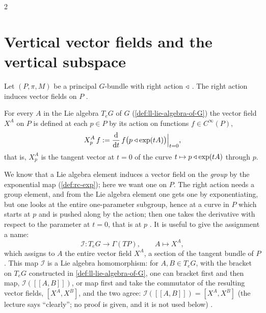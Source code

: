 \begin{paracol}{2}
\section{Vertical vector fields and the vertical subspace}\label{sec:cn-vertical}

Let $(P,\pi,M)$ be a principal $G$-bundle with right action $\mathbin{\triangleleft}$ . The right action induces vector fields on $P$ .
\begin{definition}\label{def:cn-XA}
For every $A$ in the Lie algebra $T_eG$ of $G$ (\cref{def:ll-lie-algebra-of-G}) the vector field $X^A$ on $P$ is defined at each $p\in P$ by its action on functions $f\in C^\infty(P)$,
\[
  X^A_p\,f:=\frac{\mathrm d}{\mathrm dt}\,f\bigl(p\mathbin{\triangleleft}\exp(tA)\bigr)\Big|_{t=0},
\]
that is, $X^A_p$ is the tangent vector at $t=0$ of the curve $t\mapsto p\mathbin{\triangleleft}\exp(tA)$ through $p$.     
\end{definition}
We know that a Lie algebra element induces a vector field on the \emph{group} by the exponential map (\cref{def:rc-exp}); here we want one on $P$. The right action needs a group element, and from the Lie algebra element one gets one by exponentiating, but one looks at the entire one-parameter subgroup, hence at a curve in $P$ which starts at $p$ and is pushed along by the action; then one takes the derivative with respect to the parameter at $t=0$, that is at $p$   . It is useful to give the assignment a name:
\[
  \mathcal I\colon T_eG\to\Gamma(TP),\qquad A\longmapsto X^A ,
\]
which assigns to $A$ the entire vector field $X^A$, a section of the tangent bundle of $P$  . This map $\mathcal I$ is a Lie algebra homomorphism: for $A,B\in T_eG$, with the bracket on $T_eG$ constructed in \cref{def:ll-lie-algebra-of-G}, one can bracket first and then map, $\mathcal I([\![A,B]\!])$, or map first and take the commutator of the resulting vector fields, $[X^A,X^B]$, and the two agree: $\mathcal I([\![A,B]\!])=[X^A,X^B]$ (the lecture says ``clearly''; no proof is given, and it is not used below)   .


\end{paracol}
